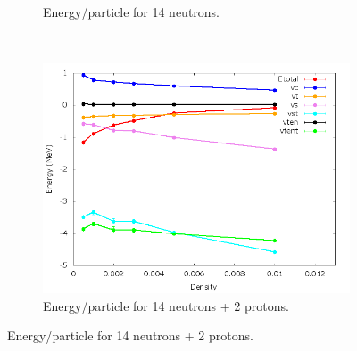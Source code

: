 \documentclass[12pt]{article}
\begin{document}
\begin{figure}[h!]
\begin{subfigure}{0.49\textwidth}
      \caption{Energy/particle for 14 neutrons.}
   \end{subfigure}
   ~
   \begin{subfigure}{0.49\textwidth}
      \includegraphics[width=\textwidth]{../av6_14n2p_ip.png}
      \caption{Energy/particle for 14 neutrons + 2 protons.}
   \end{subfigure}
\end{figure}
\newpage
\end{document}
